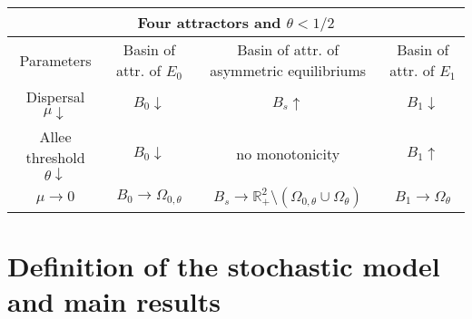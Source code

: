 \begin{table}[h]
\begin{center}
\caption{}
\label{tab:comparisondeter2}
\begin{tabular}{|c|c|c|c|}
\hline \multicolumn{4}{|c|}{Four attractors and $\theta < 1/2$} \\
\hline
 Parameters & Basin of attr. of $E_0$ & Basin of attr. of asymmetric equilibriums & Basin of attr. of $E_1$ \\ \hline
 Dispersal $\mu \downarrow$ & $B_0 \downarrow$ & $B_s \uparrow$ & $B_1 \downarrow$ \\ \hline
 Allee threshold $\theta \downarrow$ & $B_0 \downarrow$ & no monotonicity & $B_1 \uparrow$ \\ \hline
 $\mu \rightarrow 0$ & $B_0 \rightarrow \Omega_{0,\theta}$ & $B_s \rightarrow {{\mathbb{R}}}^2_+ \setminus (\Omega_{0,\theta} \cup \Omega_\theta)$ & $B_1 \rightarrow \Omega_{\theta}$ \\
\hline
\end{tabular}
\end{center}
\end{table}

\section{ Definition of the stochastic model and main results}
\label{sec:stochastic}

